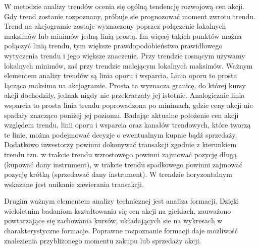 \documentclass[pdflatex,11pt]{aghdpl}
\begin{document}
W metodzie analizy trendów ocenia się ogólną tendencję rozwojową cen akcji. Gdy trend zostanie rozpoznany, próbuje sie prognozować moment zwrotu trendu\cite{8}. Trend na akcjogramie zostaje wyznaczony poprzez połączenie lokalnych maksimów lub minimów jedną linią prostą. Im więcej takich punktów można połączyć linią trendu, tym większe prawdopodobieństwo prawidłowego wytyczenia trendu i jego większe znaczenie. Przy trendzie rosnącym używamy lokalnych minimów, zaś przy trendzie malejącym lokalnych maksimów. Ważnym elementem analizy trendów są linia oporu i wsparcia. Linia oporu to prosta łącząca maksima na akcjogramie. Prosta ta wyznacza granicę, do której kursy akcji dochodziły, jednak nigdy nie przekraczały jej istotnie. Analogicznie linia wsparcia to prosta linia trendu poprowadzona po minimach, gdzie ceny akcji nie spadały znacząco poniżej jej poziomu. Badając aktualne położenie cen akcji względem trendu, linii oporu i wsparcia oraz kanałów trendowych, które tworzą te linie, można podejmować decyzje o ewentualnym kupnie bądź sprzedaży. Dodatkowo inwestorzy powinni dokonywać transakcji zgodnie z kierunkiem trendu tzn. w trakcie trendu wzrostowego powinni zajmować pozycję długą (kupować dany instrument), w trakcie trendu spadkowego powinni zajmować pozycję krótką (sprzedawać dany instrument). W trendzie horyzontalnym wskazane jest unikanie zawierania transakcji\cite{6}.

Drugim ważnym elementem analizy technicznej jest analiza formacji. Dzięki wieloletnim badaniom kształtowania się cen akcji na giełdach, zauważono powtarzające się zachowania kursów, układających sie na wykresach w charakterystyczne formacje. Poprawne rozpoznanie formacji daje możliwość znalezienia przybliżonego momentu zakupu lub sprzedaży akcji. 
\end{document}
